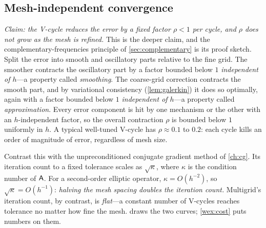 \subsection{Mesh-independent convergence}

\emph{Claim: the V-cycle reduces the error by a fixed factor $\rho<1$ per cycle, and
$\rho$ does not grow as the mesh is refined.} This is the deeper claim, and the
complementary-frequencies principle of \cref{sec:complementary} is its proof sketch. Split
the error into smooth and oscillatory parts relative to the fine grid. The smoother
contracts the oscillatory part by a factor bounded below $1$ \emph{independent of $h$}---a
property called \emph{smoothing}. The coarse-grid correction contracts the smooth part,
and by variational consistency (\cref{lem:galerkin}) it does so optimally, again with a
factor bounded below $1$ \emph{independent of $h$}---a property called \emph{approximation}.
Every error component is hit by one mechanism or the other with an $h$-independent factor,
so the overall contraction $\rho$ is bounded below $1$ uniformly in $h$. A typical
well-tuned V-cycle has $\rho \approx 0.1$ to $0.2$: each cycle kills an order of magnitude
of error, regardless of mesh size.

Contrast this with the unpreconditioned conjugate gradient method of \cref{ch:cg}. Its
iteration count to a fixed tolerance scales as $\sqrt{\kappa}$, where $\kappa$ is the
condition number of $\mathsf{A}$. For a second-order elliptic operator, $\kappa = O(h^{-2})$,
so $\sqrt{\kappa} = O(h^{-1})$: \emph{halving the mesh spacing doubles the iteration count.}
Multigrid's iteration count, by contrast, is \emph{flat}---a constant number of V-cycles
reaches tolerance no matter how fine the mesh.  draws the two curves;
\cref{wex:cost} puts numbers on them.

